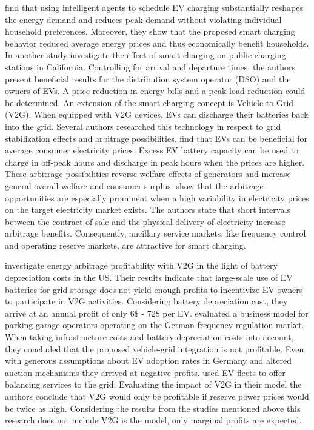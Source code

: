 \documentclass[12pt, article]{article}
\begin{document}
\textcite{valogianni14_effec_manag_elect_vehic_storag} find that using intelligent
agents to schedule EV charging substantially reshapes the energy demand and
reduces peak demand without violating individual household preferences.
Moreover, they show that the proposed smart charging behavior reduced average
energy prices and thus economically benefit households. In another study
\textcite{kara15_estim_benef_elect_vehic_smart} investigate the effect of smart
charging on public charging stations in California. Controlling for arrival and
departure times, the authors present beneficial results for the distribution
system operator (DSO) and the owners of EVs. A price reduction in energy bills
and a peak load reduction could be determined. An extension of the smart
charging concept is Vehicle-to-Grid (V2G). When equipped with V2G devices, EVs
can discharge their batteries back into the grid. Several authors researched
this technology in respect to grid stabilization effects and arbitrage
possibilities. \textcite{schill11_elect_vehic_imper_elect_market} find that EVs
can be beneficial for average consumer electricity prices. Excess EV battery
capacity can be used to charge in off-peak hours and discharge in peak hours
when the prices are higher. These arbitrage possibilities reverse welfare
effects of generators and increase general overall welfare and consumer surplus.
\textcite{tomic07_using_fleet_elect_drive_vehic_grid_suppor} show that the
arbitrage opportunities are especially prominent when a high variability in
electricity prices on the target electricity market exists. The authors state
that short intervals between the contract of sale and the physical delivery of
electricity increase arbitrage benefits. Consequently, ancillary service
markets, like frequency control and operating reserve markets, are attractive
for smart charging.

\textcite{peterson10_econom_using_plug_in_hybrid} investigate energy arbitrage
profitability with V2G in the light of battery depreciation costs in the US.
Their results indicate that large-scale use of EV batteries for grid storage
does not yield enough profits to incentivize EV owners to participate in V2G
activities. Considering battery depreciation cost, they arrive at an annual
profit of only 6\$ - 72\$ per EV.
\textcite{brandt17_evaluat_busin_model_vehic_grid_integ} evaluated a business
model for parking garage operators operating on the German frequency regulation
market. When taking infrastructure costs and battery depreciation costs into
account, they concluded that the proposed vehicle-grid integration is not
profitable. Even with generous assumptions about EV adoption rates in Germany
and altered auction mechanisms they arrived at negative profits.
\textcite{kahlen17_fleet} used EV fleets to offer balancing services to the grid.
Evaluating the impact of V2G in their model the authors conclude that V2G would
only be profitable if reserve power prices would be twice as high. Considering
the results from the studies mentioned above this research does not include V2G
is the model, only marginal profits are expected.
\end{document}
